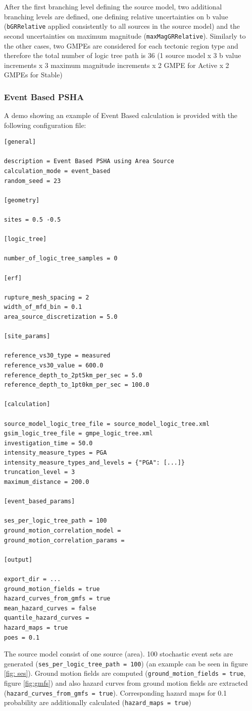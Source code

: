 After the first branching level defining the source model, two additional branching levels are defined, one defining
relative uncertainties on b value (\texttt{bGRRelative} applied consistently to all sources in the source model)
and the second uncertainties on maximum magnitude (\texttt{maxMagGRRelative}). Similarly to the other cases,
two GMPEs are considered for each tectonic region type and therefore the total number of logic tree path is 36
(1 source model x 3 b value increments x 3 maximum magnitude increments x 2 GMPE for Active x 2 GMPEs for Stable)

\subsubsection{Event Based PSHA}
A demo showing an example of Event Based calculation is provided with the following configuration file:
\begin{Verbatim}[frame=single, commandchars=\\\{\}, fontsize=\normalsize]
[general]

description = Event Based PSHA using Area Source
calculation_mode = event_based
random_seed = 23

[geometry]

sites = 0.5 -0.5

[logic_tree]

number_of_logic_tree_samples = 0

[erf]

rupture_mesh_spacing = 2
width_of_mfd_bin = 0.1
area_source_discretization = 5.0

[site_params]

reference_vs30_type = measured
reference_vs30_value = 600.0
reference_depth_to_2pt5km_per_sec = 5.0
reference_depth_to_1pt0km_per_sec = 100.0

[calculation]

source_model_logic_tree_file = source_model_logic_tree.xml
gsim_logic_tree_file = gmpe_logic_tree.xml
investigation_time = 50.0
intensity_measure_types = PGA
intensity_measure_types_and_levels = {"PGA": [...]}
truncation_level = 3
maximum_distance = 200.0

[event_based_params]

ses_per_logic_tree_path = 100
ground_motion_correlation_model =
ground_motion_correlation_params =

[output]

export_dir = ...
ground_motion_fields = true
hazard_curves_from_gmfs = true
mean_hazard_curves = false
quantile_hazard_curves =
hazard_maps = true
poes = 0.1
\end{Verbatim}
The source model consist of one source (area). 100 stochastic event sets are generated (\texttt{ses\_\-per\_\-logic\_\-tree\_\-path = 100}) (an example can be seen
in figure \ref{fig: ses}). Ground motion fields are computed (\texttt{ground\_\-motion\_\-fields = true}, figure \ref{fig:gmfs}) and also hazard curves from ground motion fields are
extracted (\texttt{hazard\_\-curves\_\-from\_\-gmfs = true}).
Corresponding hazard maps for 0.1 probability are additionally calculated (\texttt{hazard\_\-maps = true})

